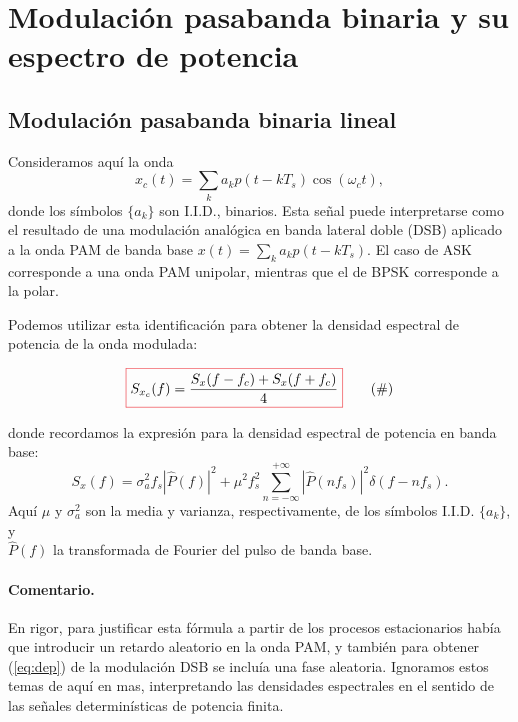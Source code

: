 \section{Modulación pasabanda binaria y su espectro de potencia}
%

\subsection*{Modulación pasabanda binaria lineal}

Consideramos aquí la onda
\[
x_c(t) = \sum_k a_k p(t-kT_s) \cos(\omega_c t),
\]
donde los símbolos $\{a_k\}$ son I.I.D., binarios. Esta se\~nal puede interpretarse
como el resultado de una modulación analógica en banda lateral doble (DSB) aplicado a la onda PAM de banda base $x(t) = \sum_k a_k p(t-kT_s)$.
El caso de ASK corresponde a una onda PAM unipolar, mientras que el de BPSK corresponde a la polar.

\newpage

Podemos utilizar esta identificación para obtener la densidad espectral de potencia de la onda modulada:

\begin{equation}
    \label{eq:dep}
    \col{S_{x_c}(f) = \frac{S_x(f-f_c) + S_x(f+f_c)}{4}}\tag{\#}
\end{equation}

\noindent donde recordamos la expresión para la densidad espectral de potencia en banda base:
\[
S_x(f) = \sigma_a^2 f_s |\hat{P}(f)|^2 + \mu^2 f_s^2 \sum_{n=-\infty}^{+\infty} |\hat{P}(n f_s)|^2\delta(f-nf_s).
\]
Aquí $\mu$ y $\sigma_a^2$ son la media y varianza, respectivamente, de los símbolos I.I.D. $\{a_k\}$, y \\ $\hat{P}(f)$ la
transformada de Fourier del pulso de banda base.


\paragraph{Comentario.} En rigor, para justificar esta fórmula a partir de los procesos estacionarios había que introducir
un retardo aleatorio en la onda PAM, y también para obtener (\ref{eq:dep}) de la modulación DSB se incluía una fase aleatoria.
Ignoramos estos temas de aquí en mas, interpretando las densidades
espectrales en el sentido de las señales determinísticas de
potencia finita.


